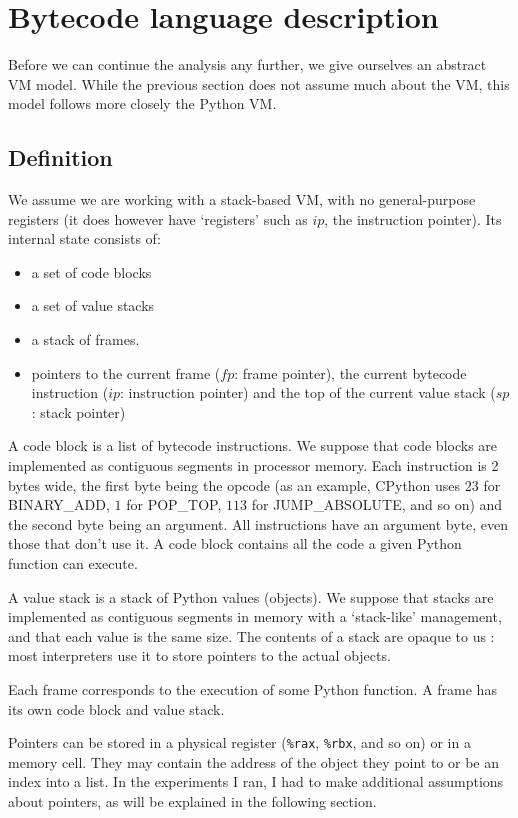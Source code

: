 \documentclass[english]{article}
\begin{document}
\section{Bytecode language description}

Before we can continue the analysis any further, we give ourselves an abstract VM model. While the previous section does not assume much about the VM, this model follows more closely the Python VM.
\subsection{Definition}

We assume we are working with a stack-based VM, with no general-purpose registers (it does however have `registers' such as $ip$, the instruction pointer). Its internal state consists of:
\begin{itemize}
	\item a set of code blocks 
	\item a set of value stacks 
	\item a stack of frames.  
	\item pointers to the current frame ($fp$: frame pointer), the current bytecode instruction ($ip$: instruction pointer) and the top of the current value stack ($sp$: stack pointer)
\end{itemize}

A code block is a list of bytecode instructions. We suppose that code blocks are implemented as contiguous segments in processor memory. Each instruction is 2 bytes wide, the first byte being the opcode (as an example, CPython uses $23$ for BINARY\_ADD, $1$ for POP\_TOP, $113$ for JUMP\_ABSOLUTE, and so on) and the second byte being an argument. All instructions have an argument byte, even those that don't use it. A code block contains all the code a given Python function can execute.

A value stack is a stack of Python values (objects). We suppose that stacks are implemented as contiguous segments in memory with a `stack-like' management, and that each value is the same size. The contents of a stack are opaque to us : most interpreters use it to store pointers to the actual objects.

Each frame corresponds to the execution of some Python function. A frame has its own code block and value stack.

Pointers can be stored in a physical register (\texttt{\%rax}, \texttt{\%rbx}, and so on) or in a memory cell. They may contain the address of the object they point to or be an index into a list. In the experiments I ran, I had to make additional assumptions about pointers, as will be explained in the following section.
\end{document}
